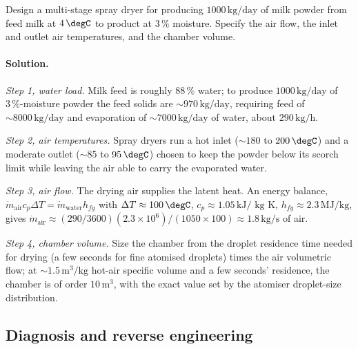 \begin{exercise}
Design a multi-stage spray dryer for producing $1000\,\text{kg/day}$
of milk powder from feed milk at $4\,\degC$ to product at $3\,\%$
moisture. Specify the air flow, the inlet and outlet air
temperatures, and the chamber volume.

\paragraph{Solution.}
\textit{Step 1, water load.} Milk feed is roughly $88\,\%$ water; to
produce $1000\,\text{kg/day}$ of $3\,\%$-moisture powder the feed
solids are $\sim 970\,\text{kg/day}$, requiring feed of $\sim
8000\,\text{kg/day}$ and evaporation of $\sim 7000\,\text{kg/day}$ of
water, about $290\,\text{kg/h}$.

\textit{Step 2, air temperatures.} Spray dryers run a hot inlet
($\sim 180$ to $200\,\degC$) and a moderate outlet ($\sim 85$ to
$95\,\degC$) chosen to keep the powder below its scorch limit while
leaving the air able to carry the evaporated water.

\textit{Step 3, air flow.} The drying air supplies the latent heat. An
energy balance, $\dot m_{\text{air}}c_{p}\Delta T = \dot m_{\text{water}}
h_{fg}$ with $\Delta T \approx 100\,\degC$, $c_p \approx 1.05\,\text{kJ/
kg K}$, $h_{fg}\approx 2.3\,\text{MJ/kg}$, gives $\dot m_{\text{air}}
\approx (290/3600)(2.3\times 10^{6})/(1050\times 100) \approx
1.8\,\text{kg/s}$ of air.

\textit{Step 4, chamber volume.} Size the chamber from the droplet
residence time needed for drying (a few seconds for fine atomised
droplets) times the air volumetric flow; at $\sim 1.5\,\text{m}^3/
\text{kg}$ hot-air specific volume and a few seconds' residence, the
chamber is of order $10\,\text{m}^3$, with the exact value set by the
atomiser droplet-size distribution.
\end{exercise}

\subsection*{Diagnosis and reverse engineering}

